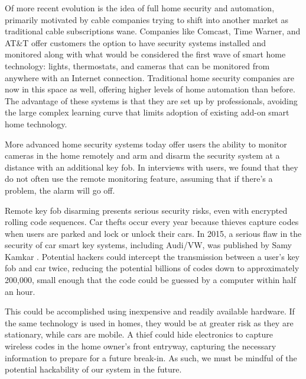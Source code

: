 Of more recent evolution is the idea of full home security and automation, primarily motivated by cable companies trying to shift into another market as traditional cable subscriptions wane. Companies like Comcast, Time Warner, and AT\&{}T offer customers the option to have security systems installed and monitored along with what would be considered the first wave of smart home technology: lights, thermostats, and cameras that can be monitored from anywhere with an Internet connection. Traditional home security companies are now in this space as well, offering higher levels of home automation than before. The advantage of these systems is that they are set up by professionals, avoiding the large complex learning curve that limits adoption of existing add-on smart home technology.

More advanced home security systems today offer users the ability to monitor cameras in the home remotely and arm and disarm the security system at a distance with an additional key fob. In interviews with users, we found that they do not often use the remote monitoring feature, assuming that if there's a problem, the alarm will go off.

Remote key fob disarming presents serious security risks, even with encrypted rolling code sequences. Car thefts occur every year because thieves capture codes when users are parked and lock or unlock their cars. In 2015, a serious flaw in the security of car smart key systems, including Audi/VW, was published by Samy Kamkar \cite[pp. 58 -- 67]{CarKeyHack}.
Potential hackers could intercept the transmission between a user's key fob and car twice, reducing the potential billions of codes down to approximately 200,000, small enough that the code could be guessed by a computer within half an hour.

This could be accomplished using inexpensive and readily available hardware. If the same technology is used in homes, they would be at greater risk as they are stationary, while cars are mobile. A thief could hide electronics to capture wireless codes in the home owner's front entryway, capturing the necessary information to prepare for a future break-in.
As such, we must be mindful of the potential hackability of our system in the future.

